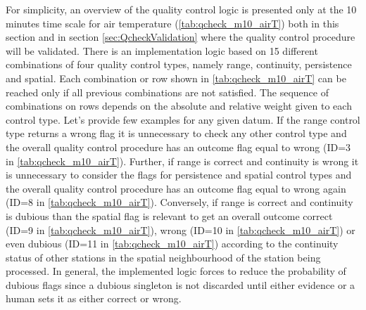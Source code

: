 \documentclass[authoryear,preprint,review,12pt]{elsarticle}
\newcommand{\note}[1]{\emph{\textcolor{red}{#1}}}
\begin{document}
For simplicity, an overview of the quality control logic is presented only at the 10 minutes time scale for air temperature (\cref{tab:qcheck_m10_airT}) both in this section and in section \ref{sec:QcheckValidation} where the quality control procedure will be validated.
There is an implementation logic based on 15 different combinations of four quality control types, namely range, continuity, persistence and spatial.
Each combination or row shown in \cref{tab:qcheck_m10_airT} can be reached only if all previous combinations are not satisfied.
The sequence of combinations on rows depends on the absolute and relative weight given to each control type.
Let's provide few examples for any given datum.
If the range control type returns a wrong flag it is unnecessary to check any other control type and the overall quality control procedure has an outcome flag equal to wrong (ID=3 in \cref{tab:qcheck_m10_airT}).
Further, if range is correct and continuity is wrong it is unnecessary to consider the flags for persistence and spatial control types and the overall quality control procedure has an outcome flag equal to wrong again (ID=8 in \cref{tab:qcheck_m10_airT}).
Conversely, if range is correct and continuity is dubious than the spatial flag is relevant to get an overall outcome correct (ID=9 in \cref{tab:qcheck_m10_airT}), wrong (ID=10 in \cref{tab:qcheck_m10_airT}) or even dubious (ID=11 in \cref{tab:qcheck_m10_airT}) according to the continuity status of other stations in the spatial neighbourhood of the station being processed.
In general, the implemented logic forces to reduce the probability of dubious flags since a dubious singleton is not discarded until either evidence or a human sets it as either correct or wrong.

\end{document}
